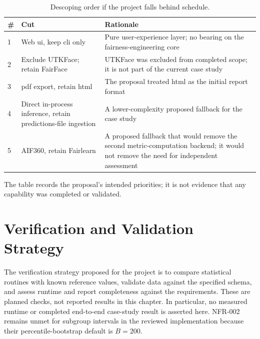 \begin{table}[htbp]
    \centering
    \renewcommand{\arraystretch}{1.3}
    \caption{Descoping order if the project falls behind schedule.}
    \label{tab:cutlist}
    \begin{tabular}{p{0.6cm}p{3.6cm}p{7.3cm}}
        \toprule
        \textbf{\#} & \textbf{Cut} & \textbf{Rationale} \\
        \midrule
        1 & Web \gls{ui}, keep \gls{cli} only & Pure user-experience layer; no bearing on the fairness-engineering core \\
        2 & Exclude UTKFace; retain FairFace & UTKFace was excluded from completed scope; it is not part of the current case study \\
        3 & \gls{pdf} export, retain \gls{html} & The proposal treated \gls{html} as the initial report format \\
        4 & Direct in-process inference, retain predictions-file ingestion & A lower-complexity proposed fallback for the case study \\
        5 & AIF360, retain Fairlearn & A proposed fallback that would remove the second metric-computation backend; it would not remove the need for independent assessment \\
        \bottomrule
    \end{tabular}
\end{table}

The table records the proposal's intended priorities; it is not evidence that any capability was completed or validated.

\section{Verification and Validation Strategy}

The verification strategy proposed for the project is to compare statistical routines with known reference values, validate data against the specified schema, and assess runtime and report completeness against the requirements. These are planned checks, not reported results in this chapter. In particular, no measured runtime or completed end-to-end case-study result is asserted here. NFR-002 remains unmet for subgroup intervals in the reviewed implementation because their percentile-bootstrap default is \(B=200\).
